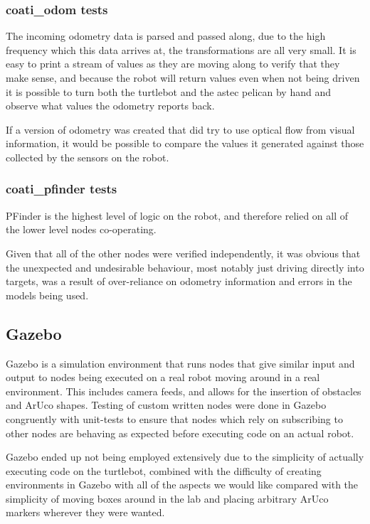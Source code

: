 \documentclass{article}[12]
\begin{document}
	\subsubsection{coati\_odom tests}
	
	The incoming odometry data is parsed and passed along, due to the high frequency which this data arrives at, the transformations are all very small. It is easy to print a stream of values as they are moving along to verify that they make sense, and because the robot will return values even when not being driven it is possible to turn both the turtlebot and the astec pelican by hand and observe what values the odometry reports back.
	
	If a version of odometry was created that did try to use optical flow from visual information, it would be possible to compare the values it generated against those collected by the sensors on the robot.
	
	\subsubsection{coati\_pfinder tests}
	
	PFinder is the highest level of logic on the robot, and therefore relied on all of the lower level nodes co-operating. 
	
	Given that all of the other nodes were verified independently, it was obvious that the unexpected and undesirable behaviour, most notably just driving directly into targets, was a result of over-reliance on odometry information and errors in the models being used. 
	
	\subsection{Gazebo}
	
	Gazebo is a simulation environment that runs nodes that give similar input and output to nodes being executed on a real robot moving around in a real environment. This includes camera feeds, and allows for the insertion of obstacles and ArUco shapes. Testing of custom written nodes were done in Gazebo congruently with unit-tests to ensure that nodes which rely on subscribing to other nodes are behaving as expected before executing code on an actual robot.
	
	Gazebo ended up not being employed extensively due to the simplicity of actually executing code on the turtlebot, combined with the difficulty of creating environments in Gazebo with all of the aspects we would like compared with the simplicity of moving boxes around in the lab and placing arbitrary ArUco markers wherever they were wanted.
	
\end{document}

